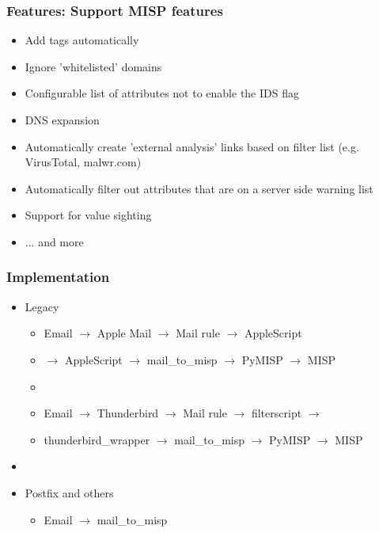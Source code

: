\begin{frame}
    \frametitle{Features: Support MISP features}
    \begin{itemize}
        \item Add tags automatically
        \item Ignore 'whitelisted' domains
        \item Configurable list of attributes not to enable the IDS flag
        \item DNS expansion
        \item Automatically create 'external analysis' links based on filter list (e.g. VirusTotal, malwr.com)
        \item Automatically filter out attributes that are on a server side warning list
        \item Support for value sighting
        \item ... and more
    \end{itemize}
\end{frame}

\begin{frame}
    \frametitle{Implementation}
    \begin{itemize}
        \item Legacy
        \begin{itemize}
            \item Email $\to$ Apple Mail $\to$ Mail rule $\to$ AppleScript
            \item[] $\to$ AppleScript $\to$ mail\_to\_misp $\to$ PyMISP $\to$ MISP
            \item[]
            \item Email $\to$ Thunderbird $\to$ Mail rule $\to$ filterscript $\to$
            \item[]thunderbird\_wrapper $\to$ mail\_to\_misp $\to$ PyMISP $\to$ MISP
        \end{itemize}
        \item[]
        \item Postfix and others
        \begin{itemize}
            \item Email $\to$ mail\_to\_misp
        \end{itemize}
    \end{itemize}
\end{frame}

